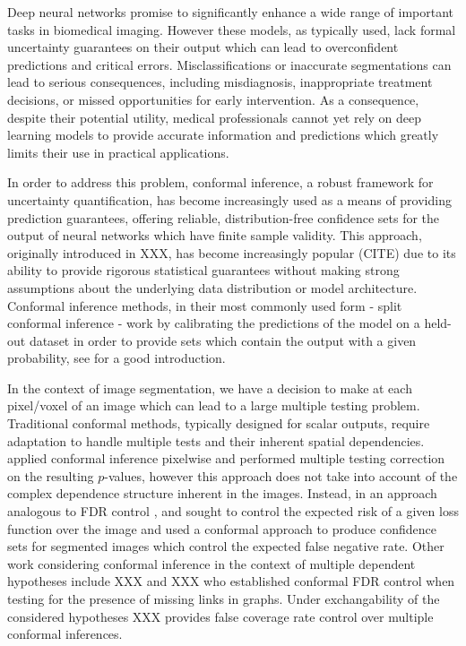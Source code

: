 


Deep neural networks promise to significantly enhance a wide range of important tasks in biomedical imaging. However these models, as typically used, lack formal uncertainty guarantees on their output which can lead to overconfident predictions and critical errors. Misclassifications or inaccurate segmentations can lead to serious consequences, including misdiagnosis, inappropriate treatment decisions, or missed opportunities for early intervention.  As a consequence, despite their potential utility, medical professionals cannot yet rely on deep learning models to provide accurate information and predictions which greatly limits their use in practical applications. 

In order to address this problem, conformal inference, a robust framework for uncertainty quantification, has become increasingly used as a means of providing prediction guarantees, offering reliable, distribution-free confidence sets for the output of neural networks which have finite sample validity. This approach, originally introduced in XXX, has become increasingly popular (CITE) due to its ability to provide rigorous statistical guarantees without making strong assumptions about the underlying data distribution or model architecture. Conformal inference methods, in their most commonly used form - split conformal inference - work by calibrating the predictions of the model on a held-out dataset in order to provide sets which contain the output with a given probability, see \cite{Angelopoulos2021} for a good introduction.

In the context of image segmentation, we have a decision to make at each pixel/voxel of an image which can lead to a large multiple testing problem. Traditional conformal methods, typically designed for scalar outputs, require adaptation to handle multiple tests and their inherent spatial dependencies. \cite{Angelopoulos2021LTT} applied conformal inference pixelwise and performed multiple testing correction on the resulting $p$-values, however this approach does not take into account of the complex dependence structure inherent in the images. Instead, in an approach analogous to FDR control \citep{Benjamini1995}, \cite{Bates2021} and \cite{Angelopoulos2022} sought to control the expected risk of a given loss function over the image and used a conformal approach to produce confidence sets for segmented images which control the expected false negative rate. Other work considering conformal inference in the context of multiple dependent hypotheses include XXX and XXX who established conformal FDR control when testing for the presence of missing links in graphs. Under exchangability of the considered hypotheses XXX provides false coverage rate control over multiple conformal inferences.


